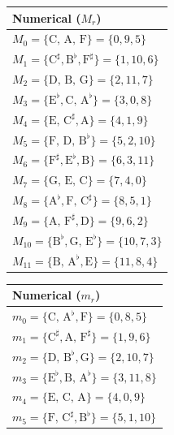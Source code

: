 \documentclass[11pt,letterpaper]{amsart}
\begin{document}
{\tiny \begin{table}[H]
    \centering
    \begin{minipage}{0.48\textwidth}
        \centering
        \begin{tabular}{l}
        \toprule
        \textbf{Numerical ($M_r$)} \\
        \midrule
        $M_0 = \{\text{C, A, F}\} = \{0, 9, 5\}$ \\
        $M_1 = \{\text{C}^\sharp, \text{B}^\flat, \text{F}^\sharp\} = \{1, 10, 6\}$ \\
        $M_2 = \{\text{D, B, G}\} = \{2, 11, 7\}$ \\
        $M_3 = \{\text{E}^\flat, \text{C, A}^\flat\} = \{3, 0, 8\}$ \\
        $M_4 = \{\text{E, C}^\sharp, \text{A}\} = \{4, 1, 9\}$ \\
        $M_5 = \{\text{F, D, B}^\flat\} = \{5, 2, 10\}$ \\
        $M_6 = \{\text{F}^\sharp, \text{E}^\flat, \text{B}\} = \{6, 3, 11\}$ \\
        $M_7 = \{\text{G, E, C}\} = \{7, 4, 0\}$ \\
        $M_8 = \{\text{A}^\flat, \text{F, C}^\sharp\} = \{8, 5, 1\}$ \\
        $M_9 = \{\text{A, F}^\sharp, \text{D}\} = \{9, 6, 2\}$ \\
        $M_{10} = \{\text{B}^\flat, \text{G, E}^\flat\} = \{10, 7, 3\}$ \\
        $M_{11} = \{\text{B, A}^\flat, \text{E}\} = \{11, 8, 4\}$ \\
        \bottomrule
        \end{tabular}
    \end{minipage}\hfill
    \begin{minipage}{0.48\textwidth}
        \centering
        \begin{tabular}{l}
        \toprule
        \textbf{Numerical ($m_r$)} \\
        \midrule
        $m_0 = \{\text{C, A}^\flat, \text{F}\} = \{0, 8, 5\}$ \\
        $m_1 = \{\text{C}^\sharp, \text{A, F}^\sharp\} = \{1, 9, 6\}$ \\
        $m_2 = \{\text{D, B}^\flat, \text{G}\} = \{2, 10, 7\}$ \\
        $m_3 = \{\text{E}^\flat, \text{B, A}^\flat\} = \{3, 11, 8\}$ \\
        $m_4 = \{\text{E, C, A}\} = \{4, 0, 9\}$ \\
        $m_5 = \{\text{F, C}^\sharp, \text{B}^\flat\} = \{5, 1, 10\}$ \\

\end{tabular}
\end{minipage}
\end{table}}
\end{document}
